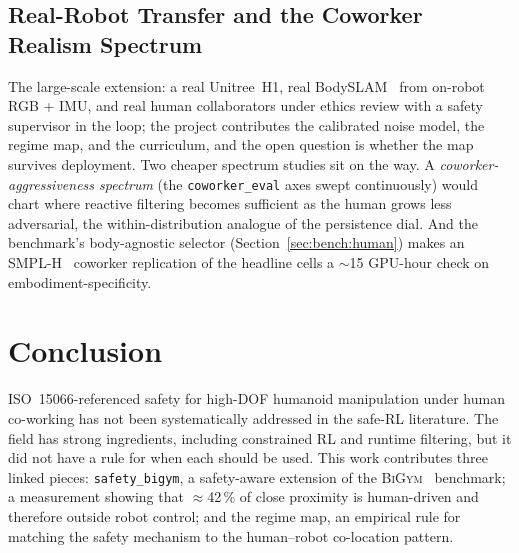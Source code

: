 \documentclass[11pt,a4paper]{report}
\newcommand{\iso}{ISO~15066}
\newcommand{\bigym}{\textsc{BiGym}}
\newcommand{\sbigym}{\texttt{safety\_bigym}}
\newcommand{\bodyslampp}{BodySLAM\nolinebreak[4]\hspace{-.05em}\raisebox{.2ex}{\scriptsize ++}}
\begin{document}
\section{Real-Robot Transfer and the Coworker Realism Spectrum}
\label{sec:fw:realbody}
\label{sec:fw:embodiment}

The large-scale extension: a real Unitree~H1, real
\bodyslampp{}~\cite{henning2023bodyslampp} from on-robot RGB + IMU,
and real human collaborators under ethics review with a safety
supervisor in the loop; the project contributes the calibrated noise
model, the regime map, and the curriculum, and the open question is
whether the map survives deployment. Two cheaper spectrum studies
sit on the way. A \emph{coworker-aggressiveness spectrum} (the
\texttt{coworker\_eval} axes swept continuously) would chart where
reactive filtering becomes sufficient as the human grows less
adversarial, the within-distribution analogue of the persistence
dial. And the benchmark's body-agnostic selector
(Section~\ref{sec:bench:human}) makes an SMPL-H~\cite{romero2017smplh}
coworker replication of the headline cells a $\sim$15 GPU-hour check
on embodiment-specificity.


\chapter{Conclusion}
\label{ch:conclusion}

\noindent
\iso{}-referenced safety for high-DOF humanoid manipulation under
human co-working has not been systematically addressed in the safe-RL
literature. The field has strong ingredients, including constrained
RL and runtime filtering, but it did not have a rule for when each
should be used. This work contributes three linked pieces: \sbigym{},
a safety-aware extension of the \bigym{}~\cite{chernyadev2024bigym}
benchmark; a measurement showing that $\approx$42\,\% of close
proximity is human-driven and therefore outside robot control; and the
regime map, an empirical rule for matching the safety mechanism to the
human--robot co-location pattern.
\end{document}
